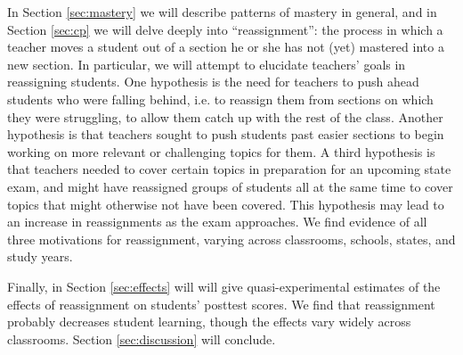 \documentclass[12pt]{article}\usepackage[]{graphicx}\usepackage[]{color}
\begin{document}
In Section \ref{sec:mastery} we will describe patterns of mastery in general,
and in Section \ref{sec:cp} we will delve deeply into ``reassignment'': the process in which a
teacher moves a student out of a section he or she has not (yet)
mastered into a new section.
In particular, we will attempt to elucidate teachers' goals in
reassigning students. One hypothesis is the need for teachers to push
ahead students who were falling behind, i.e. to reassign them from
sections on which they were struggling, to allow them catch up with
the rest of the class. Another hypothesis is that teachers sought to
push students past easier sections to begin working on more relevant
or challenging topics for them. A third hypothesis is that teachers needed to cover certain topics in preparation for an upcoming state exam, and might have reassigned groups of students all at the same time to cover topics that might otherwise not have been covered. This hypothesis may lead to an increase in reassignments as the exam approaches.
We find evidence of all three motivations for reassignment, varying
across classrooms, schools, states, and study  years.

Finally, in Section \ref{sec:effects} will will give
quasi-experimental estimates of the effects of reassignment on
students' posttest scores.
We find that reassignment probably decreases student learning,
though the effects vary widely across classrooms.
Section \ref{sec:discussion} will conclude.
\end{document}
